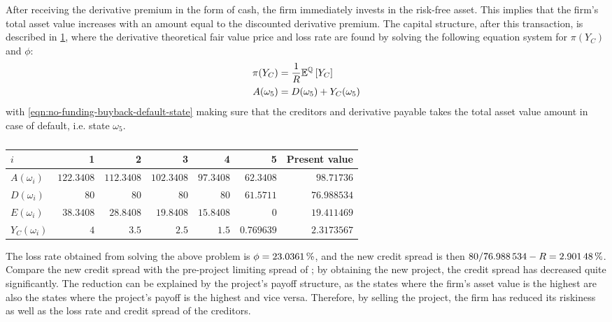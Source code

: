 \documentclass[main.tex]{subfiles}
\begin{document}
            After receiving the derivative premium in the form of cash, the firm immediately invests in the risk-free asset. 
            This implies that the firm's total asset value increases with an amount equal to the discounted derivative premium. 
            The capital structure, after this transaction, is described in \cref{tbl:example-no-funding-buyback}, 
            where the derivative theoretical fair value price and loss rate are found
            by solving the following equation system for $\pi(Y_C)$ and $\phi$:
            \begin{align}
                \pi(Y_C) &= \frac{1}{R}\mathbb{E}^{\mathbb{Q}}\left[Y_{C}\right]
                \label{eqn:no-funding-buyback-derivative-fair-value}
                \\
                A(\omega_5) &= D(\omega_5) + Y_C(\omega_5)
                \label{eqn:no-funding-buyback-default-state}
            \end{align}
            with \cref{eqn:no-funding-buyback-default-state} making sure that the creditors and derivative payable
            takes the total asset value amount in case of default, i.e. state $\omega_5$.

            \begin{table}[H]
                \centering
                \begin{tabular}{l|rrrrr||r}
                    $i$ & 1 & 2 & 3 & 4 & 5 & Present value \\
                    \hline
                    $A(\omega_{i})$ & $\num{122.3408}$ & $\num{112.3408}$ & $\num{102.3408}$ & $\num{97.3408}$ & $\num{62.3408}$ & $\num{98.71736}$ \\
                    $D(\omega_{i})$ & $\num{80}$ & $\num{80}$ & $\num{80}$ & $\num{80}$ & $\num{61.5711}$ & $\num{76.988534}$ \\
                    $E(\omega_{i})$ & $38.3408$ & $\num{28.8408}$ & $\num{19.8408}$ & $\num{15.8408}$ & $\num{0}$ & $\num{19.411469}$ \\
                    $Y_C(\omega_{i})$ & $\num{4}$ & $\num{3.5}$ & $\num{2.5}$ & $\num{1.5}$ & $\num{0.769639}$ & $\num{2.3173567}$ \\
                \end{tabular}
                \caption{}
                \label{tbl:example-no-funding-buyback}
            \end{table}

            The loss rate obtained from solving the above problem is $\phi = \pct{0.230361}$, 
            and the new credit spread is then 
            $\num{80}/\num{76.988534} - \grossrfrate = \pct{0.0290148}$.
            Compare the new credit spread with the pre-project limiting spread of ;
            by obtaining the new project, the credit spread has decreased quite significantly.
            The reduction can be explained by the project's payoff structure,
            as the states where the firm's asset value is the highest are
            also the states where the project's payoff is the highest and vice versa. 
            Therefore, by selling the project, the firm has reduced its riskiness
            as well as the loss rate and credit spread of the creditors.
\end{document}
